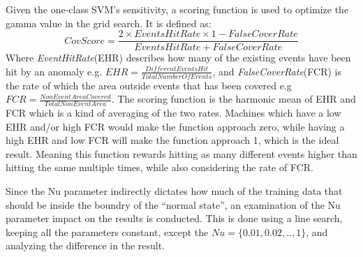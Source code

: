 Given the one-class SVM's sensitivity, a scoring function is used to optimize the gamma value in the grid search. It is defined as: 
\[CovScore = \frac{2 \times EventsHitRate \times 1-FalseCoverRate}{EventsHitRate + FalseCoverRate}\]
Where \textit{EventHitRate}(EHR) describes how many of the existing events have been hit by an anomaly e.g. $EHR = \frac{DifferentEventsHit}{TotalNumberOfEvents}$, and \textit{FalseCoverRate}(FCR) is the rate of which the area outside events that has been covered e.g $FCR = \frac{NonEventAreaCovered}{TotalNonEventArea}$. 
The scoring function is the harmonic mean of EHR and FCR which is a kind of averaging of the two rates.
Machines which have a low EHR and/or high FCR would make the function approach zero, while having a high EHR and low FCR will make the function approach 1, which is the ideal result.
Meaning this function rewards hitting as many different events higher than hitting the same multiple times, while also considering the rate of FCR.

Since the Nu parameter indirectly dictates how much of the training data that should be inside the boundry of the ``normal state'', an examination of the Nu parameter impact on the results is conducted.
This is done using a line search, keeping all the parameters constant, except the $Nu = \{0.01, 0.02,.., 1\}$, and analyzing the difference in the result. 
